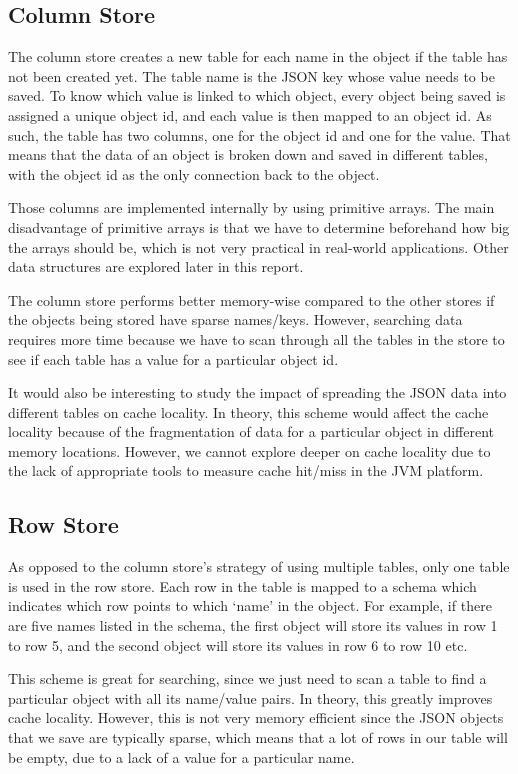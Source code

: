 \documentclass[11pt,journal,compsoc]{IEEEtran}
\begin{document}
\subsection{Column Store}

The column store creates a new table for each name in the object if the table
has not been created yet. The table name is the JSON key whose value needs to be
saved. To know which value is linked to which object, every object being saved
is assigned a unique object id, and each value is then mapped to an object id.
As such, the table has two columns, one for the object id and one for the value.
That means that the data of an object is broken down and saved in different
tables, with the object id as the only connection back to the object.


Those columns are implemented internally by using primitive arrays. The main
disadvantage of primitive arrays is that we have to determine beforehand how big
the arrays should be, which is not very practical in real-world applications.
Other data structures are explored later in this report.


The column store performs better memory-wise compared to the other stores if the
objects being stored have sparse names/keys. However, searching data requires
more time because we have to scan through all the tables in the store to see if
each table has a value for a particular object id.


It would also be interesting to study the impact of spreading the JSON data into
different tables on cache locality. In theory, this scheme would affect the
cache locality because of the fragmentation of data for a particular object in
different memory locations. However, we cannot explore deeper on cache locality
due to the lack of appropriate tools to measure cache hit/miss in the JVM
platform.

\subsection{Row Store}
As opposed to the column store’s strategy of using multiple tables, only one
table is used in the row store. Each row in the table is mapped to a schema
which indicates which row points to which ‘name’ in the object. For example, if
there are five names listed in the schema, the first object will store its
values in row 1 to row 5, and the second object will store its values in row 6
to row 10 etc.


This scheme is great for searching, since we just need to scan a table to find a
particular object with all its name/value pairs. In theory, this greatly
improves cache locality. However, this is not very memory efficient since the
JSON objects that we save are typically sparse, which means that a lot of rows
in our table will be empty, due to a lack of a value for a particular name.
\end{document}
